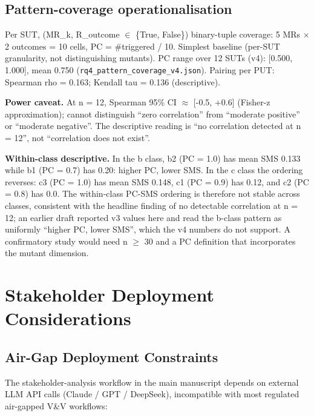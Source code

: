 \documentclass[manuscript,screen,review]{acmart}
\begin{document}
\subsection{Pattern-coverage operationalisation}\label{d.5-pattern-coverage-operationalisation}

Per SUT, (MR\_k, R\_outcome $\in$ \{True, False\}) binary-tuple coverage: 5
MRs $\times$ 2 outcomes = 10 cells, PC = \#triggered / 10. Simplest baseline
(per-SUT granularity, not distinguishing mutants). PC range over 12
SUTs (v4): {[}0.500, 1.000{]}, mean 0.750
(\texttt{rq4\_pattern\_coverage\_v4.json}).
Pairing per PUT: Spearman rho = 0.163; Kendall tau = 0.136
(descriptive).

\textbf{Power caveat.} At n = 12, Spearman 95\% CI $\approx$ {[}-0.5, +0.6{]}
(Fisher-z approximation); cannot distinguish ``zero correlation'' from ``moderate positive'' or
``moderate negative''. The descriptive reading is ``no correlation detected
at n = 12'', not ``correlation does not exist''.

\textbf{Within-class descriptive.} In the b class, b2 (PC = 1.0) has
mean SMS 0.133 while b1 (PC = 0.7) has 0.20: higher PC, lower SMS. In
the c class the ordering reverses: c3 (PC = 1.0) has mean SMS 0.148,
c1 (PC = 0.9) has 0.12, and c2 (PC = 0.8) has 0.0. The within-class
PC-SMS ordering is therefore not stable across classes, consistent with
the headline finding of no detectable correlation at n = 12; an earlier
draft reported v3 values here and read the b-class pattern as
uniformly ``higher PC, lower SMS'', which the v4 numbers do not
support. A confirmatory study would need n $\geq$ 30 and a PC
definition that incorporates the mutant dimension.


\section{Stakeholder Deployment Considerations}\label{e.-stakeholder-deployment-considerations-single-output-kernels-scope}

\subsection{Air-Gap Deployment Constraints}\label{e.1-air-gap-incompatibility-full-justification}

The stakeholder-analysis workflow in the main manuscript depends on external LLM API calls (Claude / GPT /
DeepSeek), incompatible with most regulated air-gapped V\&V workflows:
\end{document}
